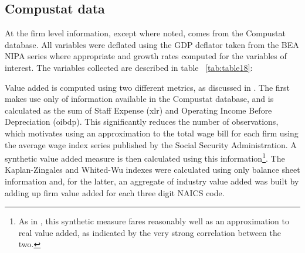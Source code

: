 \documentclass{_latex/house}
\begin{document}
\subsection{Compustat data}
At the firm level information, except where noted, comes from the Compustat database. All variables were deflated using the GDP deflator taken from the BEA NIPA series where appropriate and growth rates computed for the variables of interest. The variables collected are described in table ~\ref{tab:table18}:
\begin{table}[ht] \footnotesize
\caption{Compustat variable and abbreviation}
\begin{center}
{
}
\label{tab:table18}
\end{center}
\end{table}

Value added is computed using two different metrics, as discussed in \cite{RePEc:red:sed011:21}. The first makes use only of information available in the Compustat database, and is calculated as the sum of Staff Expense (xlr) and Operating Income Before Depreciation (oibdp). This significantly reduces the number of observations, which motivates using an approximation to the total wage bill for each firm using the average wage index series published by the Social Security Administration. A synthetic value added measure is then calculated using this information\footnote{As in \cite{RePEc:red:sed011:21}, this synthetic measure fares reasonably well as an approximation to real value added, as indicated by the very strong correlation between the two.}. The Kaplan-Zingales and Whited-Wu indexes were calculated using only balance sheet information and, for the latter, an aggregate of industry value added was built by adding up firm value added for each three digit NAICS code.
\end{document}

